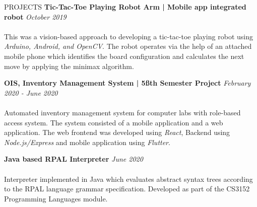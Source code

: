\documentclass{cv}
\begin{document}
\begin{rSection}{PROJECTS}
    {\bf Tic-Tac-Toe Playing Robot Arm | Mobile app integrated robot}     \hfill {\em October 2019}
    \\ \\
    This was a vision-based approach to developing a tic-tac-toe playing robot using \textit{Arduino, Android, and OpenCV}.
    The robot operates via the help of an attached mobile phone which identifies the board configuration
    and calculates the next move by applying the minimax algorithm. \par\vspace{3pt}

    {\bf OIS, Inventory Management System | 5\ss{th} Semester Project}     \hfill {\em February 2020 - June 2020}
    \\ \\
    Automated inventory management system for computer labs with role-based access system.
    The system consisted of a mobile application and a web application.
    The web frontend was developed using \textit{React}, Backend using \textit{Node.js/Express} and
    mobile application using \textit{Flutter}.\par\vspace{3pt}

    {\bf Java based RPAL Interpreter}     \hfill {\em June 2020}
    \\ \\
    Interpreter implemented in Java which evaluates abstract syntax trees according
    to the RPAL language grammar specification. Developed as part of the CS3152 Programming Languages module.\par

\end{rSection}


\end{document}
